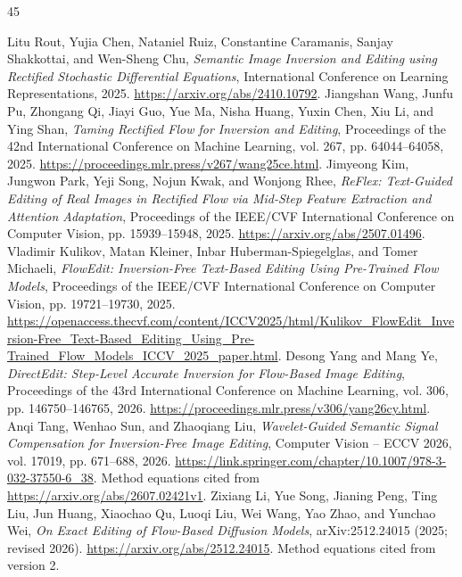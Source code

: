\documentclass[conference]{IEEEtran}
\begin{document}
\FloatBarrier
\begin{thebibliography}{45}
\raggedright
 Litu Rout, Yujia Chen, Nataniel Ruiz, Constantine Caramanis, Sanjay Shakkottai, and Wen-Sheng Chu, \textit{Semantic Image Inversion and Editing using Rectified Stochastic Differential Equations}, International Conference on Learning Representations, 2025. \url{https://arxiv.org/abs/2410.10792}.
 Jiangshan Wang, Junfu Pu, Zhongang Qi, Jiayi Guo, Yue Ma, Nisha Huang, Yuxin Chen, Xiu Li, and Ying Shan, \textit{Taming Rectified Flow for Inversion and Editing}, Proceedings of the 42nd International Conference on Machine Learning, vol. 267, pp. 64044--64058, 2025. \url{https://proceedings.mlr.press/v267/wang25ce.html}.
 Jimyeong Kim, Jungwon Park, Yeji Song, Nojun Kwak, and Wonjong Rhee, \textit{{ReFlex}: Text-Guided Editing of Real Images in Rectified Flow via Mid-Step Feature Extraction and Attention Adaptation}, Proceedings of the IEEE/CVF International Conference on Computer Vision, pp. 15939--15948, 2025. \url{https://arxiv.org/abs/2507.01496}.
 Vladimir Kulikov, Matan Kleiner, Inbar Huberman-Spiegelglas, and Tomer Michaeli, \textit{{FlowEdit}: Inversion-Free Text-Based Editing Using Pre-Trained Flow Models}, Proceedings of the IEEE/CVF International Conference on Computer Vision, pp. 19721--19730, 2025. \url{https://openaccess.thecvf.com/content/ICCV2025/html/Kulikov_FlowEdit_Inversion-Free_Text-Based_Editing_Using_Pre-Trained_Flow_Models_ICCV_2025_paper.html}.
 Desong Yang and Mang Ye, \textit{{DirectEdit}: Step-Level Accurate Inversion for Flow-Based Image Editing}, Proceedings of the 43rd International Conference on Machine Learning, vol. 306, pp. 146750--146765, 2026. \url{https://proceedings.mlr.press/v306/yang26cy.html}.
 Anqi Tang, Wenhao Sun, and Zhaoqiang Liu, \textit{Wavelet-Guided Semantic Signal Compensation for Inversion-Free Image Editing}, Computer Vision -- ECCV 2026, vol. 17019, pp. 671--688, 2026. \url{https://link.springer.com/chapter/10.1007/978-3-032-37550-6_38}. Method equations cited from \url{https://arxiv.org/abs/2607.02421v1}.
 Zixiang Li, Yue Song, Jianing Peng, Ting Liu, Jun Huang, Xiaochao Qu, Luoqi Liu, Wei Wang, Yao Zhao, and Yunchao Wei, \textit{On Exact Editing of Flow-Based Diffusion Models}, arXiv:2512.24015 (2025; revised 2026). \url{https://arxiv.org/abs/2512.24015}. Method equations cited from version 2.

\end{thebibliography}
\end{document}
